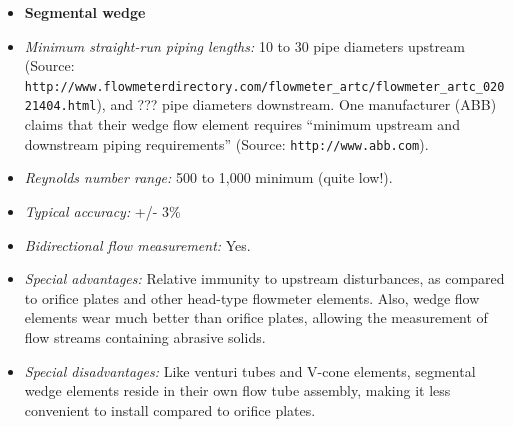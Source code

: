 \vskip 10pt


\begin{itemize}
\goodbreak
\item{} {\bf Segmental wedge} 
\item{} {\it Minimum straight-run piping lengths:} 10 to 30 pipe diameters upstream (Source: {\tt http://www.flowmeterdirectory.com/flowmeter\_artc/flowmeter\_artc\_02021404.html}), and ??? pipe diameters downstream.  One manufacturer (ABB) claims that their wedge flow element requires ``minimum upstream and downstream piping requirements'' (Source: {\tt http://www.abb.com}).
\item{} {\it Reynolds number range:} 500 to 1,000 minimum (quite low!).
\item{} {\it Typical accuracy:} +/- 3\%
\item{} {\it Bidirectional flow measurement:} Yes.
\item{} {\it Special advantages:} Relative immunity to upstream disturbances, as compared to orifice plates and other head-type flowmeter elements.  Also, wedge flow elements wear much better than orifice plates, allowing the measurement of flow streams containing abrasive solids.
\item{} {\it Special disadvantages:}  Like venturi tubes and V-cone elements, segmental wedge elements reside in their own flow tube assembly, making it less convenient to install compared to orifice plates.
\end{itemize}




